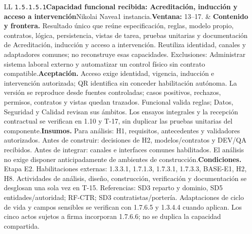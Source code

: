 \begin{longtable}{L{\tabcolsep\relax}L{\tabcolsep\relax}}
\texttt{1.\allowbreak{}5.\allowbreak{}1.\allowbreak{}5.\allowbreak{}1}\newline{}\textbf{Capacidad funcional recibida: Acreditación, inducción y acceso a intervención}\newline{}Nikolai Navea\newline{}1 instancia.\newline{}\textbf{Ventana:} 13--17. & \textbf{Contenido y frontera.} Resultado único que reúne especificación, reglas, modelo propio, contratos, lógica, persistencia, vistas de tarea, pruebas unitarias y documentación de Acreditación, inducción y acceso a intervención. Reutiliza identidad, canales y adaptadores comunes; no reconstruye esas capacidades. Exclusiones: Administrar sistema laboral externo y automatizar un control físico sin contrato compatible.\newline{}\textbf{Aceptación.} Acceso exige identidad, vigencia, inducción e intervención autorizada; QR identifica sin conceder habilitación autónoma. La versión se reproduce desde fuentes controladas; casos positivos, rechazos, permisos, contratos y vistas quedan trazados. Funcional valida reglas; Datos, Seguridad y Calidad revisan sus ámbitos. Los ensayos integrales y la recepción contractual se verifican en 1.10 y T-17, sin duplicar las pruebas unitarias del componente.\newline{}\textbf{Insumos.} Para análisis: H1, requisitos, antecedentes y validadores autorizados. Antes de construir: decisiones de H2, modelos/contratos y DEV/QA recibidos. Antes de integrar: canales e interfaces comunes habilitados. El análisis no exige disponer anticipadamente de ambientes de construcción.\newline{}\textbf{Condiciones.} Etapa E2. Habilitaciones externas: 1.3.3.1, 1.7.1.3, 1.7.3.1, 1.7.3.3, BASE-E1, H2, H8. Actividades de análisis, diseño, construcción, verificación y documentación se desglosan una sola vez en T-15. Referencias: SD3 reparto y dominio, SD5 entidades/autoridad; RF-CTR; SD3 contratistas/portería. Adaptaciones de ciclo de vida y campos sensibles se verifican con 1.7.6.5 y 1.3.4.4 cuando aplican. Los cinco actos sujetos a firma incorporan 1.7.6.6; no se duplica la capacidad compartida.\\\hline

\end{longtable}

